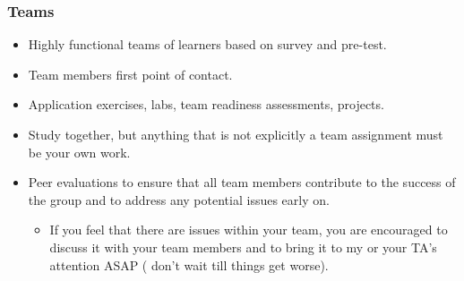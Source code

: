 \documentclass[slidestop,compress,mathserif,12pt,t,professionalfonts,xcolor=table]{beamer}
\begin{document}
\begin{frame}
\frametitle{Teams}

\begin{itemize}
\item Highly functional teams of learners based on survey and pre-test.

\item Team members first point of contact.

\item Application exercises, labs, team readiness assessments, projects.

\item Study together, but anything that is not explicitly a team assignment must be 
your own work.

\item Peer evaluations to ensure that all team members contribute to the success of 
the group and to address any potential issues early on.
\begin{itemize}
\item If you feel that there are issues within your team, you are encouraged to 
discuss it with your team members and to bring it to my or your TA's attention ASAP (
don't wait till things get worse).
\end{itemize}

\end{itemize}


\end{frame}

\end{document}

